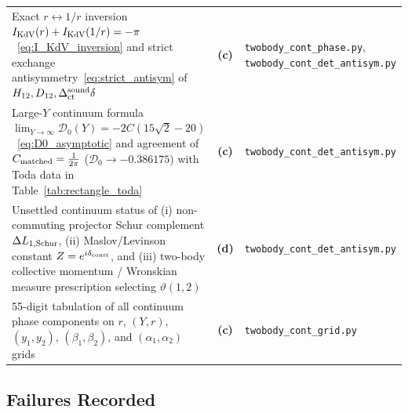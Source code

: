 \documentclass[11pt,a4paper]{article}
\newcommand{\Lc}{\textbf{(c)}}
\newcommand{\Ld}{\textbf{(d)}}
\newcommand{\script}[1]{\texttt{#1}}
\begin{document}
\begin{longtable}{@{}p{}cp{}@{}}
Exact $r\leftrightarrow 1/r$ inversion $I_{\rm KdV}(r)+I_{\rm KdV}(1/r)=-\pi$~\eqref{eq:I_KdV_inversion} and strict exchange antisymmetry~\eqref{eq:strict_antisym} of $H_{12},D_{12},\Delta_{\rm ct}^{\rm sound}\delta$ & \Lc & \script{twobody\_cont\_phase.py}, \script{twobody\_cont\_det\_antisym.py} \\
Large-$Y$ continuum formula $\lim_{Y\to\infty}\mathcal{D}_0(Y)=-2C(15\sqrt2-20)$~\eqref{eq:D0_asymptotic} and agreement of $C_{\rm matched}=\frac{1}{2\pi}$ ($\mathcal{D}_0\to -0.386175$) with Toda data in Table~\ref{tab:rectangle_toda} & \Lc & \script{twobody\_cont\_det\_antisym.py} \\
Unsettled continuum status of (i) non-commuting projector Schur complement $\Delta L_{1,\rm Schur}$, (ii) Maslov/Levinson constant $Z=e^{i\delta_{\rm const}}$, and (iii) two-body collective momentum / Wronskian measure prescription selecting $\vartheta(1,2)$ & \Ld & \script{twobody\_cont\_det\_antisym.py} \\
55-digit tabulation of all continuum phase components on $r$, $(Y,r)$, $(y_1,y_2)$, $(\beta_1,\beta_2)$, and $(\alpha_1,\alpha_2)$ grids & \Lc & \script{twobody\_cont\_grid.py} \\
\end{longtable}

\subsection{Failures Recorded}
\end{document}
